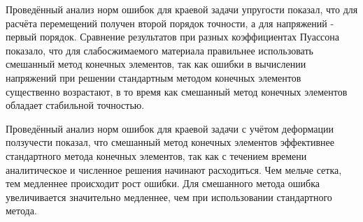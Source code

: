 \documentclass[a4paper,14pt]{extarticle}
\begin{document}
Проведённый анализ норм ошибок для краевой задачи упругости показал, что для расчёта перемещений получен второй порядок точности, а для напряжений - первый порядок. Сравнение результатов при разных коэффициентах Пуассона показало, что для слабосжимаемого материала правильнее использовать смешанный метод конечных элементов, так как ошибки в вычислении напряжений при решении стандартным методом конечных элементов существенно возрастают, в то время как смешанный метод конечных элементов обладает стабильной точностью.

Проведённый анализ норм ошибок для краевой задачи с учётом деформации ползучести показал, что смешанный метод конечных элементов эффективнее стандартного метода конечных элементов, так как с течением времени аналитическое и численное решения начинают расходиться. Чем мельче сетка, тем медленнее происходит рост ошибки. Для смешанного метода ошибка увеличивается значительно медленнее, чем при использовании стандартного метода.
\end{document}
